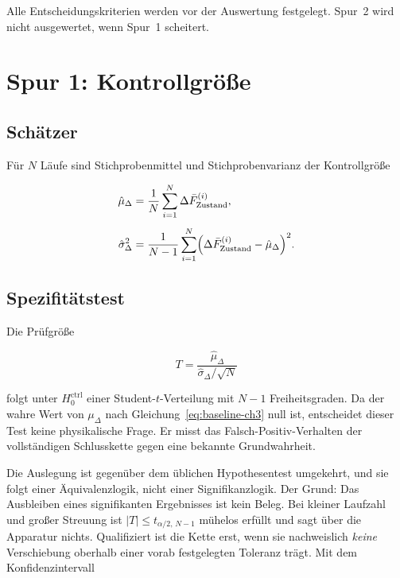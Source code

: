 \documentclass[12pt,a4paper]{report}
\begin{document}
Alle Entscheidungskriterien werden vor der Auswertung festgelegt. Spur~2
wird nicht ausgewertet, wenn Spur~1 scheitert.

\section{Spur 1: Kontrollgröße}

\subsection{Schätzer}

Für $N$ Läufe sind Stichprobenmittel und Stichprobenvarianz der
Kontrollgröße

\begin{align}
  \hat{\mu}_{\Delta} &= \frac{1}{N}\sum_{i=1}^{N}
      \Delta \bar{F}^{(i)}_{\mathrm{Zustand}},
  \label{eq:mu-hat}\\[4pt]
  \hat{\sigma}^{2}_{\Delta} &= \frac{1}{N-1}\sum_{i=1}^{N}
      \Bigl( \Delta \bar{F}^{(i)}_{\mathrm{Zustand}}
             - \hat{\mu}_{\Delta} \Bigr)^{2}.
  \label{eq:sigma-hat}
\end{align}

\subsection{Spezifitätstest}

Die Prüfgröße

\begin{equation}
  T = \frac{\hat{\mu}_{\Delta}}{\hat{\sigma}_{\Delta}/\sqrt{N}}
  \label{eq:t-stat}
\end{equation}

folgt unter $H_{0}^{\mathrm{ctrl}}$ einer Student-$t$-Verteilung mit
$N-1$ Freiheitsgraden. Da der wahre Wert von $\mu_{\Delta}$ nach
Gleichung~\eqref{eq:baseline-ch3} null ist, entscheidet dieser Test keine
physikalische Frage. Er misst das Falsch-Positiv-Verhalten der
vollständigen Schlusskette gegen eine bekannte Grundwahrheit.

Die Auslegung ist gegenüber dem üblichen Hypothesentest umgekehrt, und
sie folgt einer Äquivalenzlogik, nicht einer Signifikanzlogik. Der
Grund: Das Ausbleiben eines signifikanten Ergebnisses ist kein Beleg.
Bei kleiner Laufzahl und großer Streuung ist $|T| \leq t_{\alpha/2,\,N-1}$
mühelos erfüllt und sagt über die Apparatur nichts. Qualifiziert ist die
Kette erst, wenn sie nachweislich \emph{keine} Verschiebung oberhalb
einer vorab festgelegten Toleranz trägt. Mit dem Konfidenzintervall
\end{document}
